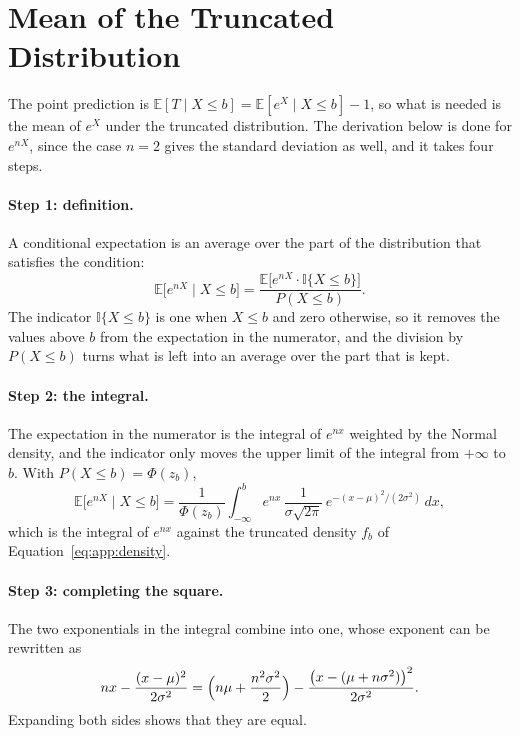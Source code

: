 \section{Mean of the Truncated Distribution}
The point prediction is $\mathbb{E}[T \mid X \le b] = \mathbb{E}[e^X \mid X
\le b] - 1$, so what is needed is the mean of $e^X$ under the truncated
distribution. The derivation below is done for $e^{nX}$, since the case
$n = 2$ gives the standard deviation as well, and it takes four steps.

\paragraph{Step 1: definition.}
A conditional expectation is an average over the part of the distribution
that satisfies the condition:
\begin{equation}
  \mathbb{E}\bigl[ e^{nX} \mid X \le b \bigr]
  = \frac{\mathbb{E}\bigl[ e^{nX} \cdot \mathbb{I}\{X \le b\} \bigr]}{P(X \le b)} .
  \label{eq:app:step1}
\end{equation}
The indicator $\mathbb{I}\{X \le b\}$ is one when $X \le b$ and zero
otherwise, so it removes the values above $b$ from the expectation in the
numerator, and the division by $P(X \le b)$ turns what is left into an
average over the part that is kept.

\paragraph{Step 2: the integral.}
The expectation in the numerator is the integral of $e^{nx}$ weighted by the
Normal density, and the indicator only moves the upper limit of the integral
from $+\infty$ to $b$. With $P(X \le b) = \Phi(z_b)$,
\begin{equation}
  \mathbb{E}\bigl[ e^{nX} \mid X \le b \bigr]
  = \frac{1}{\Phi(z_b)} \int_{-\infty}^{b} e^{nx}\,
    \frac{1}{\sigma\sqrt{2\pi}}\, e^{-(x - \mu)^2 / (2\sigma^2)}\, dx ,
  \label{eq:app:step2}
\end{equation}
which is the integral of $e^{nx}$ against the truncated density $f_b$ of
Equation~\eqref{eq:app:density}.

\paragraph{Step 3: completing the square.}
The two exponentials in the integral combine into one, whose exponent can be
rewritten as
\begin{equation}
  n x - \frac{(x - \mu)^2}{2\sigma^2}
  = \Bigl( n\mu + \frac{n^2\sigma^2}{2} \Bigr)
    - \frac{\bigl( x - (\mu + n\sigma^2) \bigr)^2}{2\sigma^2} .
  \label{eq:app:square}
\end{equation}
Expanding both sides shows that they are equal.

